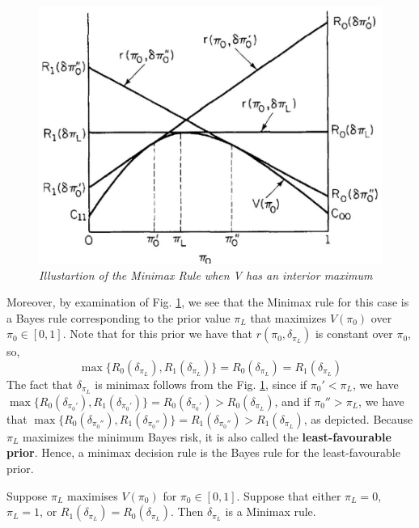 \documentclass[a4paper,english,12pt]{article}
\begin{document}
\begin{figure}[h]
	\centering
	\includegraphics[width=0.7\linewidth]{Figures/minimax2}
	\caption{\textit{Illustartion of the Minimax Rule when V has an interior maximum}}
	\label{fig:minimax2}
\end{figure}
\par Moreover, by examination of Fig. \ref{fig:minimax2}, we see that the Minimax rule for this case is a Bayes rule corresponding to the prior value $\pi_L$ that maximizes $V(\pi_0)$ over $\pi_0 \in [0,1]$. Note that for this prior we have that $r(\pi_0,\delta_{\pi_L})$ is constant over $\pi_0$, so,
\begin{equation}
\max\{ {R_0}({\delta _{{\pi _L}}}),{R_1}({\delta _{{\pi _L}}})\}  = {R_0}({\delta _{{\pi _L}}}) = {R_1}({\delta _{{\pi _L}}})
\end{equation}  
The fact that $\delta_{\pi_L}$ is minimax follows from the Fig. \ref{fig:minimax2}, since if $\pi_0' < \pi_L$, we have $\max\{ {R_0}({\delta _{\pi_0'}}),{R_1}({\delta _{\pi_0'}})\}  = {R_0}({\delta _{{\pi _0'}}})>{R_0}({\delta _{{\pi _L}}})$, and if $\pi_0'' > \pi_L$, we have that
$\max\{ {R_0}({\delta _{\pi_0''}}),{R_1}({\delta _{\pi_0''}})\}  = {R_1}({\delta _{{\pi _0''}}})>{R_1}({\delta _{{\pi _L}}})$, as depicted.
Because $\pi_L$ maximizes the minimum Bayes risk, it is also called the \textbf{least-favourable prior}. Hence, a minimax decision rule is the Bayes rule for the least-favourable prior.
\begin{prop}
Suppose $\pi_L$ maximises $V(\pi_0)$ for $\pi_0 \in [0,1]$. Suppose that either $\pi_L=0$, $\pi_L=1$, or $R_1(\delta_{\pi_L})=R_0(\delta_{\pi_L})$. Then $\delta_{\pi_L}$ is a Minimax rule.
\end{prop} 
\end{document}
